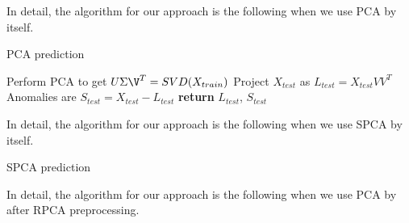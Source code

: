 \documentclass[conference]{IEEEtran}
\begin{document}
In detail, the algorithm for our approach is the following when we use PCA by itself.  

\begin{algorithm}
\caption{PCA prediction}\label{alg:pca prediction}
\begin{algorithmic}[1]
\State Perform PCA to get $U \Sigma \V^T = SVD(X_{train})$
\State Project $X_{test}$ as $L_{test} = X_{test} V V^T$
\State Anomalies are $S_{test} = X_{test} - L_{test}$
\State \textbf{return} $L_{test}$, $S_{test}$
\EndProcedure
\end{algorithmic}
\end{algorithm}

In detail, the algorithm for our approach is the following when we use SPCA by itself.

\begin{algorithm}
\caption{SPCA prediction}\label{alg:spca prediction}
\end{algorithm}

In detail, the algorithm for our approach is the following when we use PCA by after RPCA preprocessing. 
\end{document}
